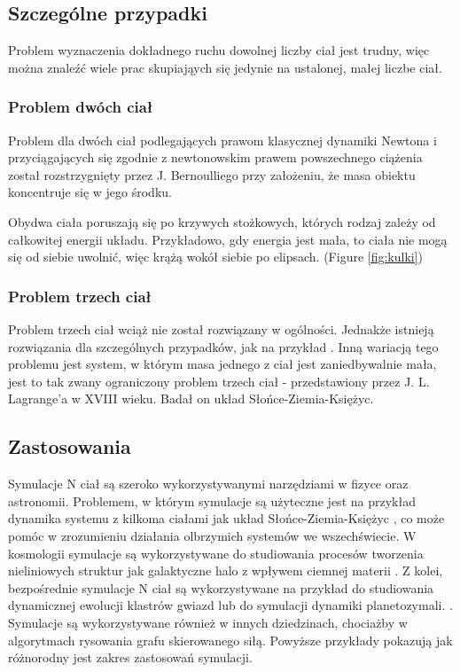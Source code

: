 \documentclass[14pt,twoside,a4paper]{article}
\theoremstyle{definition}
\begin{document}
\subsection{\Large Szczególne przypadki}
\bigskip
Problem wyznaczenia dokładnego ruchu dowolnej liczby ciał jest trudny, więc można znaleźć wiele prac skupiająych się jedynie na ustalonej, małej liczbe ciał.

\subsubsection{\large Problem dwóch ciał}
Problem dla dwóch ciał podlegających prawom klasycznej dynamiki Newtona i przyciągających się zgodnie z newtonowskim prawem powszechnego ciążenia został rozstrzygnięty przez J. Bernoulliego przy założeniu, że masa obiektu koncentruje się w jego środku. \cite[str.~1-49]{fund}

Obydwa ciała poruszają się po krzywych stożkowych, których rodzaj zależy od całkowitej energii układu. Przykładowo, gdy energia jest mała, to ciała nie mogą się od siebie uwolnić, więc krążą wokół siebie po elipsach. (Figure \ref{fig:kulki})

\subsubsection{\large Problem trzech ciał}
Problem trzech ciał wciąż nie został rozwiązany w ogólności. Jednakże istnieją rozwiązania dla szczególnych przypadków, jak na przykład \cite{threebody1, threebody2}. Inną wariacją tego problemu jest system, w którym masa jednego z ciał jest zaniedbywalnie mała, jest to tak zwany ograniczony problem trzech ciał - przedstawiony przez J. L. Lagrange'a w XVIII wieku. Badał on układ Słońce-Ziemia-Księżyc. 


\subsection{\Large Zastosowania}
\bigskip
Symulacje N ciał są szeroko wykorzystywanymi narzędziami w fizyce oraz astronomii. Problemem, w którym symulacje są użyteczne jest na przykład dynamika systemu z kilkoma ciałami jak układ Słońce-Ziemia-Księżyc \cite{SEMmisc}, co może pomóc w zrozumieniu działania olbrzymich systemów we wszechświecie. \cite{chaosMisc}
W kosmologii symulacje są wykorzystywane do studiowania procesów tworzenia nieliniowych struktur jak galaktyczne halo z wpływem ciemnej materii \cite{haloDensity}. 
Z kolei, bezpośrednie symulacje N ciał są wykorzystywane na przykład do studiowania dynamicznej ewolucji klastrów gwiazd lub do symulacji dynamiki planetozymali. \cite{dirNBody}. Symulacje są wykorzystywane również w innych dziedzinach, chociażby w algorytmach rysowania grafu skierowanego siłą. \cite{visGraph} Powyższe przykłady pokazują jak różnorodny jest zakres zastosowań symulacji.
\newpage
\end{document}
